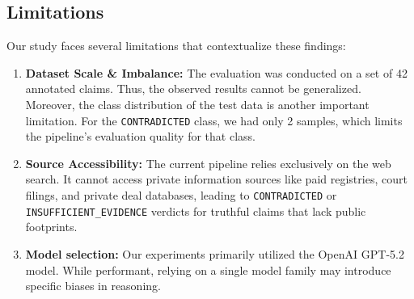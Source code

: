 \subsection{Limitations}
Our study faces several limitations that contextualize these findings:
\begin{enumerate}
    \item \textbf{Dataset Scale \& Imbalance:} The evaluation was conducted on a set of 42 annotated claims. Thus, the observed results cannot be generalized. Moreover, the class distribution of the test data is another important limitation. For the \texttt{CONTRADICTED} class, we had only 2 samples, which limits the pipeline's evaluation quality for that class.
    \item \textbf{Source Accessibility:} The current pipeline relies exclusively on the web search. It cannot access private information sources like paid registries, court filings, and private deal databases, leading to \texttt{CONTRADICTED} or \texttt{INSUFFICIENT\_EVIDENCE} verdicts for truthful claims that lack public footprints.
    \item \textbf{Model selection:} Our experiments primarily utilized the OpenAI GPT-5.2 model. While performant, relying on a single model family may introduce specific biases in reasoning.
\end{enumerate}

